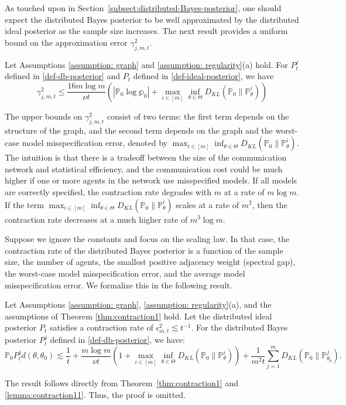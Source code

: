 \documentclass[twoside,11pt]{article}
\numberwithin{equation}{section}
\newcommand\bP{\mathbb{P}}
\newcommand\bp{\mathbb{p}}
\begin{document}
{As touched upon in Section~\ref{subsect:distributed-Bayes-posterior}, one should expect the distributed Bayes posterior to be well approximated by the distributed ideal posterior as the sample size increases. The next result provides a uniform bound on the approximation error $\gamma_{j,m,t}^2$. 
\begin{lemma}
\label{lemma:contraction11}
    Let Assumptions \ref{assumption: graph} and \ref{assumption: regularity}(a) hold. For $P_t^j$ defined in \eqref{def-db-posterior} and $P_t$ defined in \eqref{def-ideal-posterior}, we have
    \begin{equation*}
\gamma_{j,m,t}^2 \leq  \frac{16m \log m}{\nu t} \left(|\bP_0\log \bp_0| +  \max_{i \in [m]}\inf_{\theta \in \Theta} D_{KL}(\bP_0 \parallel \bP_\theta^i) \right)
    \end{equation*}
\end{lemma}
The upper bounds on $\gamma_{j,m,t}^2$ consist of two terms: the first term depends on the structure of the graph, and the second term depends on the graph and the worst-case model misspecification error, denoted by $\max_{i \in [m]}\inf_{\theta \in \Theta} D_{KL}(\bP_0 \parallel \bP_\theta^i)$. The intuition is that there is a tradeoff between the size of the communication network and statistical efficiency, and the communication cost could be much higher if one or more agents in the network use misspecified models. If all models are correctly specified, the contraction rate degrades with $m$ at a rate of $m \log m$. If the term $\max_{i \in [m]}\inf_{\theta \in \Theta} D_{KL}(\bP_0 \parallel \bP_\theta^i) $ scales at a rate of $m^2$, then the contraction rate decreases at a much higher rate of $m^3 \log m$. 

Suppose we ignore the constants and focus on the scaling law. In that case, the contraction rate of the distributed Bayes posterior is a function of the sample size, the number of agents, the smallest positive adjacency weight (spectral gap), the worst-case model misspecification error, and the average model misspecification error. We formalize this in the following result. 
\begin{theorem}\label{thm:contraction2}
Let Assumptions \ref{assumption: graph},  \ref{assumption: regularity}(a), and the assumptions of Theorem \eqref{thm:contraction1} hold. Let the distributed ideal posterior $P_t$ satisfies a contraction rate of $\epsilon_{m,t}^2 \lesssim t^{-1}$. For the distributed Bayes posterior $P_t^j$ defined in \eqref{def-db-posterior}, we have:
\begin{equation*}
    \bP_0 P_t^j d(\theta, \theta_0) \lesssim \frac{1}{t} + \frac{m \log m}{\nu t} \left(1 + \max_{i \in [m]}\inf_{\theta \in \Theta} D_{KL}(\bP_0 \parallel \bP_\theta^i) \right)  + \frac{1}{m^2 t} \sum_{j = 1}^m D_{KL}(\bP_0 \parallel \bP_{\theta_0}^j). 
\end{equation*}
\end{theorem}
The result follows directly from Theorem~\ref{thm:contraction1} and \ref{lemma:contraction11}. Thus, the proof is omitted.


}
\end{document}
